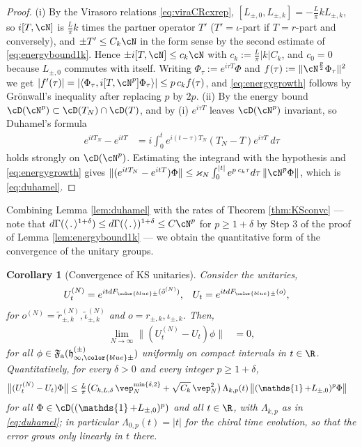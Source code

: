 \documentclass[a4paper, 11pt]{article}
\newcommand{\ua}{\textup a}
\newcommand{\fF}{\mathfrak{F}}\newcommand{\cF}{\mathcal{F}}\newcommand{\dF}{\mathds{F}}\newcommand{\sF}{\mathscr{F}}
\newcommand{\fh}{\mathfrak{h}}
\DeclareMathOperator{\1}{\mathds{1}}
\newtheorem{cor}[thm]{Corollary}
\begin{document}
\begin{proof}
(i) By the Virasoro relations \eqref{eq:viraCRcxrep}, $[L_{\pm,0},L_{\pm,k}]=-\tfrac{L}{\pi}k L_{\pm,k}$, so $i[T,\cN]$ is $\tfrac{L}{\pi}k$ times the partner operator $T'$ ($T'=\iota$-part if $T=r$-part and conversely), and $\pm T'\leq C_{k}\cN$ in the form sense by the second estimate of \eqref{eq:energybound1k}. Hence $\pm i[T,\cN]\leq c_{k}\cN$ with $c_{k}:=\tfrac{L}{\pi}|k|C_{k}$, and $c_{0}=0$ because $L_{\pm,0}$ commutes with itself. Writing $\Phi_{\tau}:=e^{i\tau T}\Phi$ and $f(\tau):=\|\cN^{\frac{p}{2}}\Phi_{\tau}\|^{2}$ we get $|f'(\tau)| = |\langle\Phi_{\tau},i[T,\cN^{p}]\Phi_{\tau}\rangle|\leq p\!\ c_{k}f(\tau)$, and \eqref{eq:energygrowth} follows by Gr\"onwall's inequality after replacing $p$ by $2p$.
(ii) By the energy bound $\cD(\cN^{p})\subset\cD(T_{N})\cap\cD(T)$, and by (i) $e^{i\tau T}$ leaves $\cD(\cN^{p})$ invariant, so Duhamel's formula
\begin{align*}
e^{itT_{N}}-e^{itT} & = i\int_{0}^{t}e^{i(t-\tau)T_{N}}(T_{N}-T)e^{i\tau T}\!\ d\tau
\end{align*}
holds strongly on $\cD(\cN^{p})$. Estimating the integrand with the hypothesis and \eqref{eq:energygrowth} gives $\|(e^{itT_{N}}-e^{itT})\Phi\|\leq\varkappa_{N}\int_{0}^{|t|}e^{p\!\ c_{k}\tau}d\tau\!\ \|\cN^{p}\Phi\|$, which is \eqref{eq:duhamel}.
\end{proof}
Combining Lemma \ref{lem:duhamel} with the rates of Theorem \ref{thm:KSconvc} --- note that $d\Gamma(\langle\!\ .\!\ \rangle^{1+\delta})\leq d\Gamma(\langle\!\ .\!\ \rangle)^{1+\delta}\leq C\cN^{p}$ for $p\geq1+\delta$ by Step 3 of the proof of Lemma \ref{lem:energybound1k} --- we obtain the quantitative form of the convergence of the unitary groups.
\begin{cor}[Convergence of KS unitaries]
\label{cor:KSunitariesc}
Consider the unitaries,
\begin{align*}
U^{(N)}_{t} & = e^{it dF_{{\color{blue}\pm}}(\tilde{o}^{(N)})}, & U_{t} & = e^{it dF_{{\color{blue}\pm}}(o)},
\end{align*}
for $o^{(N)} = \tilde{r}^{(N)}_{\pm,k}, \tilde{\iota}^{(N)}_{\pm,k}$ and $o = r_{\pm,k}, \iota_{\pm,k}$. Then,
\begin{align*}
\lim_{N\rightarrow\infty}\|(U^{(N)}_{t}-U_{t})\phi\| & = 0,
\end{align*}
for all $\phi\in\fF_{\ua}(\fh^{(\pm)}_{\infty,{\color{blue}\pm}})$ uniformly on compact intervals in $t\in\R$. Quantitatively, for every $\delta>0$ and every integer $p\geq1+\delta$,
\begin{align}
\label{eq:KSunitariescrate}
\big\|(U^{(N)}_{t}-U_{t})\Phi\big\| & \leq \tfrac{L}{\pi}\big(C_{k,L,\delta}\!\ \vep_{N}^{\min\{\delta,2\}}+\sqrt{C_{k}}\!\ \vep_{N}^{2}\big)\!\ \Lambda_{k,p}(t)\!\ \big\|(\1+L_{\pm,0})^{p}\Phi\big\|
\end{align}
for all $\Phi\in\cD((\1+L_{\pm,0})^{p})$ and all $t\in\R$, with $\Lambda_{k,p}$ as in \eqref{eq:duhamel}; in particular $\Lambda_{0,p}(t)=|t|$ for the chiral time evolution, so that the error grows only linearly in $t$ there.
\end{cor}
\end{document}
